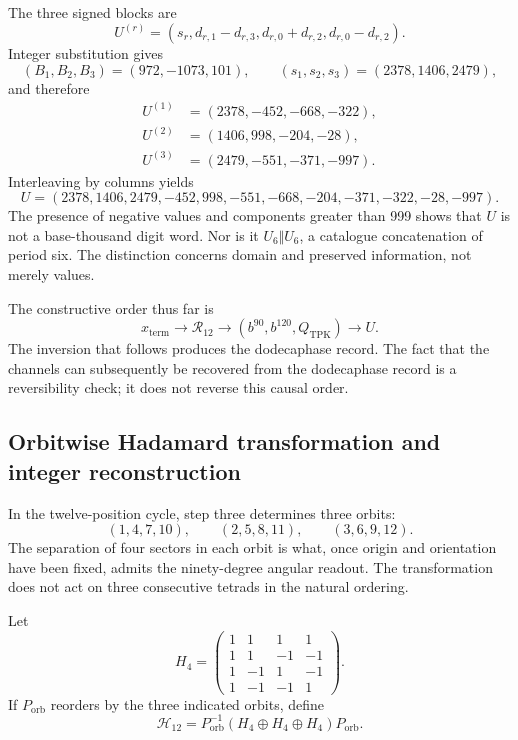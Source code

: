 The three signed blocks are
\begin{equation}
 U^{(r)}=(s_r,d_{r,1}-d_{r,3},d_{r,0}+d_{r,2},d_{r,0}-d_{r,2}).
 \label{eq:k-bloques-firmados}
\end{equation}
Integer substitution gives
\[
 (B_1,B_2,B_3)=(972,-1073,101),\qquad
 (s_1,s_2,s_3)=(2378,1406,2479),
\]
and therefore
\begin{align*}
 U^{(1)}&=(2378,-452,-668,-322),\\
 U^{(2)}&=(1406,998,-204,-28),\\
 U^{(3)}&=(2479,-551,-371,-997).
\end{align*}
Interleaving by columns yields
\begin{equation}
 U=(2378,1406,2479,-452,998,-551,
       -668,-204,-371,-322,-28,-997).
 \label{eq:k-u-firmado}
\end{equation}
The presence of negative values and components greater than 999
shows that \(U\) is not a base-thousand digit word. Nor is it
\(U_6\Vert U_6\), a catalogue concatenation of period six. The distinction
concerns domain and preserved information, not merely values.

The constructive order thus far is
\[
 x_{\mathrm{term}}\longrightarrow\mathcal R_{12}
 \longrightarrow(b^{90},b^{120},Q_{\mathrm{TPK}})
 \longrightarrow U.
\]
The inversion that follows produces the dodecaphase record. The fact that the
channels can subsequently be recovered from the dodecaphase record is a reversibility check; it does not
reverse this causal order.

\subsection{Orbitwise Hadamard transformation and integer reconstruction}
\label{subsec:k-hadamard}

In the twelve-position cycle, step three determines three orbits:
\[
 (1,4,7,10),\qquad(2,5,8,11),\qquad(3,6,9,12).
\]
The separation of four sectors in each orbit is what, once
origin and orientation have been fixed, admits the ninety-degree angular readout. The
transformation does not act on three consecutive tetrads in the natural ordering.

Let
\[
 H_4=\begin{pmatrix}
 1&1&1&1\\1&1&-1&-1\\1&-1&1&-1\\1&-1&-1&1
 \end{pmatrix}.
\]
If \(P_{\mathrm{orb}}\) reorders by the three indicated orbits,
define
\[
 \mathcal H_{12}=P_{\mathrm{orb}}^{-1}
 (H_4\oplus H_4\oplus H_4)P_{\mathrm{orb}}.
\]

